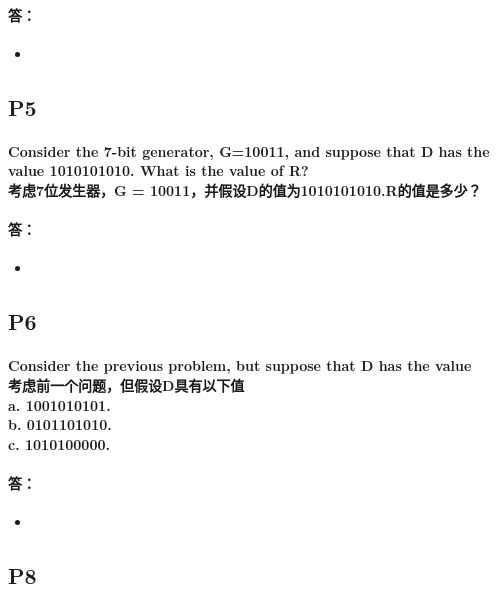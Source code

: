 \documentclass[a4paper]{ctexart}
\begin{document}
\paragraph*{答：} 
\begin{itemize}
    \item 
\end{itemize}

\subsection*{P5}
\paragraph*{Consider the 7-bit generator, G=10011, and suppose that D has the value 1010101010. What is the value of R?\\
考虑7位发生器，G = 10011，并假设D的值为1010101010.R的值是多少？}
\paragraph*{答：} 
\begin{itemize}
    \item 
\end{itemize}

\subsection*{P6}
\paragraph*{Consider the previous problem, but suppose that D has the value\\
考虑前一个问题，但假设D具有以下值\\
a. 1001010101.\\
b. 0101101010.\\
c. 1010100000.\\}
\paragraph*{答：} 
\begin{itemize}
    \item 
\end{itemize}

\subsection*{P8}
\end{document}
